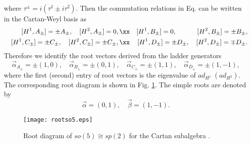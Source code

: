 \documentclass[12pt,epsf]{article}
\begin{document}
where $ \tau^\pm = i( \tau^1 \pm i \tau^2)$.
Then the commutation relations in Eq.  can be written in the Cartan-Weyl basis as
\begin{eqnarray}\label{cartan-weyl}
  && [H^1, A_\pm ] = \pm  A_\pm, \quad [H^2, A_\pm ] = 0, \xx
  && [H^1, B_\pm ] = 0, \hspace{1.1cm} [H^2, B_\pm ] = \pm B_\pm, \\
  && [H^1, C_\pm ] = \pm C_\pm, \quad [H^2, C_\pm ] = \pm C_\pm, \xx
  && [H^1, D_\pm ] = \pm D_\pm,  \quad [H^2, D_\pm ] = \mp D_\pm.  \nonumber
\end{eqnarray}
Therefore we identify the root vectors derived from the ladder generators
\begin{equation}\label{rootvector}
  \vec{\alpha}_{A_\pm} = \pm (1,0), \quad \vec{\alpha}_{B_\pm} = \pm (0,1),
  \quad \vec{\alpha}_{C_\pm} = \pm (1,1), \quad
  \vec{\alpha}_{D_\pm} = \pm (1,-1),
\end{equation}
where the first (second) entry of root vectors  is the eigenvalue of $ad_{H^1} \; (ad_{H^2})$.
The corresponding root diagram is shown in Fig. \ref{sp2-root1}. The simple roots are denoted by
\begin{equation}\label{sroot}
  \vec{\alpha}=(0,1), \quad \vec{\beta}=(1,-1).
\end{equation}



\begin{figure}
\centering
\texttt{[image: rootso5.eps]}
\caption{Root diagram of $so(5) \cong sp(2)$ for the Cartan subalgebra .}
\label{sp2-root1}
\end{figure}
\end{document}
